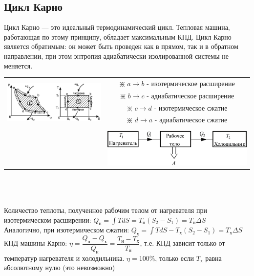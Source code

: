 \begin{multicols*}{2}
		\section{Цикл Карно}
		Цикл Карно — это идеальный термодинамический цикл. Тепловая машина, работающая по этому принципу, обладает максимальным КПД. Цикл Карно является обратимым: он может быть проведен как в прямом, так и в обратном направлении, при этом энтропия адиабатически изолированной системы не меняется.\\
		\begin{tabular}{cc}
			\multirow{5}{*}{\includegraphics[width=0.55\linewidth]{td_imgs/karno_1}} & $\divideontimes$ $a \rightarrow b$ - изотермическое расширение\\
			{} & $\divideontimes$ $b \rightarrow c$ - адиабатическое расширение\\
			{} & $\divideontimes$ $c \rightarrow d$ - изотермическое сжатие\\
			{} & $\divideontimes$ $d \rightarrow a$ - адиабатическое сжатие\\\\
			{} & \includegraphics[width=0.35\linewidth]{td_imgs/karno_2} \\
		\end{tabular}\\\\\\
		Количество теплоты, полученное рабочим телом от нагревателя при изотермическом расширении: $Q_{\text{н}} = \int TdS = T_{\text{н}}(S_2 - S_1) = T_{\text{н}} \Delta S$\\
		Аналогично, при изотермическом сжатии: $Q_{\text{х}} = \int TdS - T_{\text{х}}(S_2 - S_1) = T_{\text{х}} \Delta S$\\
		КПД машины Карно: $\eta = \dfrac{Q_{\text{н}} - Q_{\text{х}}}{Q_{\text{н}}} = \dfrac{T_{\text{н}} - T_{\text{х}}}{T_{\text{н}}}$, т.е. КПД зависит только от температур нагревателя и холодильника. $\eta = 100\%$, только если $T_{\text{х}}$ равна абсолютному нулю (это невозможно)\\
	

\end{multicols*}
